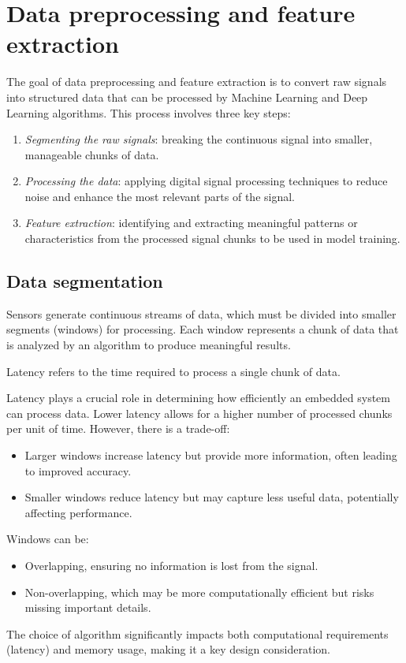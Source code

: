 \section{Data preprocessing and feature extraction}

The goal of data preprocessing and feature extraction  is to convert raw signals into structured data that can be processed by Machine Learning and Deep Learning algorithms.
This process involves three key steps:
\begin{enumerate}
    \item \textit{Segmenting the raw signals}: breaking the continuous signal into smaller, manageable chunks of data.
    \item \textit{Processing the data}: applying digital signal processing techniques to reduce noise and enhance the most relevant parts of the signal.
    \item \textit{Feature extraction}: identifying and extracting meaningful patterns or characteristics from the processed signal chunks to be used in model training.
\end{enumerate}

\subsection{Data segmentation}
Sensors generate continuous streams of data, which must be divided into smaller segments (windows) for processing. 
Each window represents a chunk of data that is analyzed by an algorithm to produce meaningful results.
\begin{definition}
    Latency refers to the time required to process a single chunk of data.
\end{definition}
\noindent Latency plays a crucial role in determining how efficiently an embedded system can process data. 
Lower latency allows for a higher number of processed chunks per unit of time. However, there is a trade-off:
\begin{itemize}
    \item Larger windows increase latency but provide more information, often leading to improved accuracy.
    \item Smaller windows reduce latency but may capture less useful data, potentially affecting performance.
\end{itemize}
\noindent Windows can be:
\begin{itemize}
    \item Overlapping, ensuring no information is lost from the signal.
    \item Non-overlapping, which may be more computationally efficient but risks missing important details.
\end{itemize}
\noindent The choice of algorithm significantly impacts both computational requirements (latency) and memory usage, making it a key design consideration.


